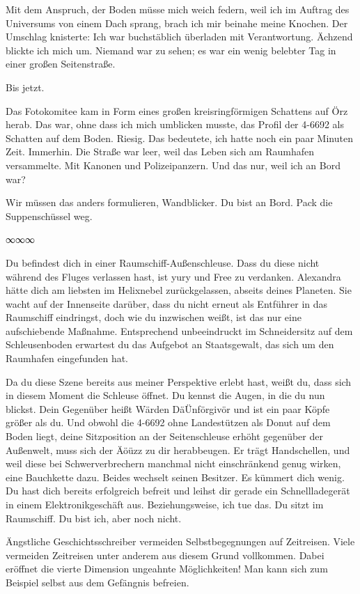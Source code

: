 Mit dem Anspruch, der Boden müsse mich weich federn, weil ich im Auftrag des Universums von einem Dach sprang, brach ich mir beinahe meine Knochen. Der Umschlag knisterte: Ich war buchstäblich überladen mit Verantwortung. Ächzend blickte ich mich um. Niemand war zu sehen; es war ein wenig belebter Tag in einer großen Seitenstraße.

Bis jetzt.

Das Fotokomitee kam in Form eines großen kreisringförmigen Schattens auf Örz herab. Das war, ohne dass ich mich umblicken musste, das Profil der 4-6692 als Schatten auf dem Boden. Riesig. Das bedeutete, ich hatte noch ein paar Minuten Zeit. Immerhin. Die Straße war leer, weil das Leben sich am Raumhafen versammelte. Mit Kanonen und Polizeipanzern. Und das nur, weil ich an Bord war?

Wir müssen das anders formulieren, Wandblicker. Du bist an Bord. Pack die Suppenschüssel weg.

\begin{center}
∞∞∞
\end{center}

Du befindest dich in einer Raumschiff-Außenschleuse. Dass du diese nicht während des Fluges verlassen hast, ist yury und Free zu verdanken. Alexandra hätte dich am liebsten im Helixnebel zurückgelassen, abseits deines Planeten. Sie wacht auf der Innenseite darüber, dass du nicht erneut als Entführer in das Raumschiff eindringst, doch wie du inzwischen weißt, ist das nur eine aufschiebende Maßnahme. Entsprechend unbeeindruckt im Schneidersitz auf dem Schleusenboden erwartest du das Aufgebot an Staatsgewalt, das sich um den Raumhafen eingefunden hat.

Da du diese Szene bereits aus meiner Perspektive erlebt hast, weißt du, dass sich in diesem Moment die Schleuse öffnet. Du kennst die Augen, in die du nun blickst. Dein Gegenüber heißt Wärden DäÜnförgivör und ist ein paar Köpfe größer als du. Und obwohl die 4-6692 ohne Landestützen als Donut auf dem Boden liegt, deine Sitzposition an der Seitenschleuse erhöht gegenüber der Außenwelt, muss sich der Äöüzz zu dir herabbeugen. Er trägt Handschellen, und weil diese bei Schwerverbrechern manchmal nicht einschränkend genug wirken, eine Bauchkette dazu. Beides wechselt seinen Besitzer. Es kümmert dich wenig. Du hast dich bereits erfolgreich befreit und leihst dir gerade ein Schnellladegerät in einem Elektronikgeschäft aus. Beziehungsweise, ich tue das. Du sitzt im Raumschiff. Du bist ich, aber noch nicht.

Ängstliche Geschichtsschreiber vermeiden Selbstbegegnungen auf Zeitreisen. Viele vermeiden Zeitreisen unter anderem aus diesem Grund vollkommen. Dabei eröffnet die vierte Dimension ungeahnte Möglichkeiten! Man kann sich zum Beispiel selbst aus dem Gefängnis befreien.

